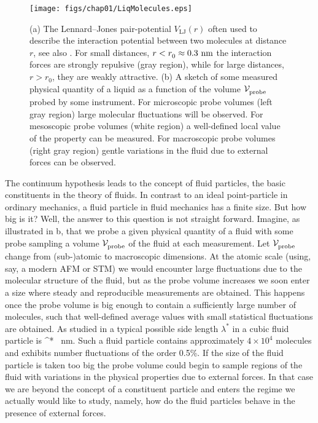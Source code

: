 \begin{figure}
\centerline{
  \texttt{[image: figs/chap01/LiqMolecules.eps]}}
\caption[Lennard--Jones potential]{ (a) The
Lennard--Jones pair-potential $V^{{}}_\textrm{LJ}(r)$ often used
to describe the interaction potential between two molecules at
distance $r$, see also . For small distances,
$r<r^{{}}_0\approx0.3~\textrm{nm}$ the interaction forces are strongly
repulsive (gray region), while for large distances, $r>r^{{}}_0$,
they are weakly attractive. (b) A sketch of some measured physical
quantity of a liquid as a function of the volume
$\mathcal{V}^{{}}_\textrm{probe}$ probed by some instrument. For
microscopic probe volumes (left gray region) large molecular
fluctuations will be observed. For mesoscopic probe volumes (white
region) a well-defined local value of the property can be
measured. For macroscopic probe volumes (right gray region) gentle
variations in the fluid due to external forces can be observed.}
\end{figure}

The continuum hypothesis leads to the concept of fluid particles,
the basic constituents in the theory of fluids. In contrast to an
ideal point-particle in ordinary mechanics, a fluid particle in
fluid mechanics has a finite size. But how big is it? Well, the
answer to this question is not  straight forward. Imagine, as
illustrated in b, that we probe a given
physical quantity of a fluid with some probe sampling a volume
$\mathcal{V}^{{}}_\textrm{probe}$ of the fluid at each measurement. Let
$\mathcal{V}^{{}}_\textrm{probe}$ change from (sub-)atomic to macroscopic
dimensions. At the atomic scale (using, say, a modern AFM or STM)
we would encounter large fluctuations due to the molecular
structure of the fluid, but as the probe volume increases we soon
enter a size where steady and reproducible measurements are
obtained. This happens once the probe volume is big enough to
contain a sufficiently large number of molecules, such that
well-defined average values with small statistical fluctuations
are obtained. As studied in  a typical
possible side length $\lambda^*$ in a cubic fluid particle is
%
  \lambda^* ~\textrm{nm}.
 \eeq
%
Such a fluid particle contains approximately $4\times10^4$
molecules and exhibits number fluctuations of the order 0.5\%.
 If the size of
the fluid particle is taken too big the probe volume could begin
to sample regions of the fluid with variations in the physical
properties due to external forces. In that case we are beyond the
concept of a constituent particle and enters the regime we
actually would like to study, namely, how do the fluid particles
behave in the presence of external forces.

